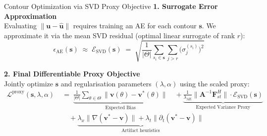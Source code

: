 \documentclass[aspectratio=169]{beamer}
\begin{document}
\begin{frame}{Contour Optimization via SVD Proxy Objective}
  \textbf{1. Surrogate Error Approximation}\\
  Evaluating $\|\mathbf{u}-\hat{\mathbf{u}}\|$ requires training an AE for each contour $\mathbf{s}$. We approximate it via the mean SVD residual (optimal linear surrogate of rank $r$):
  \vspace{-0.5em}
  \[ \epsilon_{\mathrm{AE}}(\mathbf{s}) \;\approx\; \mathcal{E}_{\mathrm{SVD}}(\mathbf{s}) \;=\; \sqrt{ \frac{1}{|\Theta|} \sum_{s_i \in \mathbf{s}} \sum_{j > r} \bigl(\sigma_j^{(s_i)}\bigr)^2 } \]
  
  \textbf{2. Final Differentiable Proxy Objective}\\
  Jointly optimize $\mathbf{s}$ and regularisation parameters $(\lambda, \alpha)$ using the scaled proxy:
  \vspace{-0.5em}
  \begin{align*}
      \mathcal{L}^{\mathrm{proxy}}(\mathbf{s}, \lambda, \alpha) \;&=\; \underbrace{\frac{1}{|\Theta|} \sum_{\theta \in \Theta} \|\mathbf{v}(\theta) - \mathbf{v}^*(\theta)\|}_{\text{Expected Bias}}
      \quad + \underbrace{\frac{1}{\lambda_{\mathrm{AE}}} \|\mathbf{A}^{-1}\mathbf{F}_{st}^H\| \cdot \mathcal{E}_{\mathrm{SVD}}(\mathbf{s})}_{\text{Expected Variance Proxy}} \\
      &\quad + \underbrace{\lambda_x \|\nabla (\mathbf{v}^* -\mathbf{v})\| + \lambda_t \|\partial_t (\mathbf{v}^* -\mathbf{v})\|}_{\text{Artifact heuristics}}
  \end{align*}
\end{frame}
\end{document}
